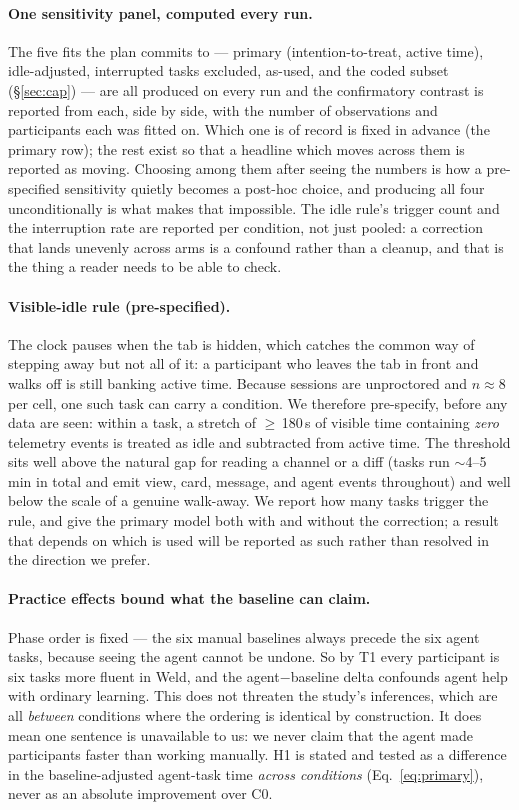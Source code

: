 \documentclass[11pt]{article}
\begin{document}
\paragraph{One sensitivity panel, computed every run.} The five fits the plan
commits to --- primary (intention-to-treat, active time), idle-adjusted,
interrupted tasks excluded, as-used, and the coded subset
(\S\ref{sec:cap}) --- are all produced on every run and the
confirmatory contrast is reported from each, side by side, with the number of
observations and participants each was fitted on. Which one is of record is fixed
in advance (the primary row); the rest exist so that a headline which moves
across them is reported as moving. Choosing among them after seeing the numbers
is how a pre-specified sensitivity quietly becomes a post-hoc choice, and
producing all four unconditionally is what makes that impossible. The idle rule's
trigger count and the interruption rate are reported per condition, not just
pooled: a correction that lands unevenly across arms is a confound rather than a
cleanup, and that is the thing a reader needs to be able to check.

\paragraph{Visible-idle rule (pre-specified).} The clock pauses when the tab is
hidden, which catches the common way of stepping away but not all of it: a
participant who leaves the tab in front and walks off is still banking active
time. Because sessions are unproctored and $n\approx8$ per cell, one such task
can carry a condition. We therefore pre-specify, before any data are seen: within
a task, a stretch of $\geq$\,180\,s of visible time containing \emph{zero}
telemetry events is treated as idle and subtracted from active time. The
threshold sits well above the natural gap for reading a channel or a diff
(tasks run $\sim$4--5\,min in total and emit view, card, message, and agent
events throughout) and well below the scale of a genuine walk-away. We report how
many tasks trigger the rule, and give the primary model both with and without the
correction; a result that depends on which is used will be reported as such
rather than resolved in the direction we prefer.

\paragraph{Practice effects bound what the baseline can claim.} Phase order is
fixed --- the six manual baselines always precede the six agent tasks, because
seeing the agent cannot be undone. So by T1 every participant is six tasks more
fluent in Weld, and the agent$-$baseline delta confounds agent help with ordinary
learning. This does not threaten the study's inferences, which are all
\emph{between} conditions where the ordering is identical by construction. It
does mean one sentence is unavailable to us: we never claim that the agent made
participants faster than working manually. H1 is stated and tested as a
difference in the baseline-adjusted agent-task time \emph{across conditions}
(Eq.~\eqref{eq:primary}), never as an absolute improvement over C0.
\end{document}
